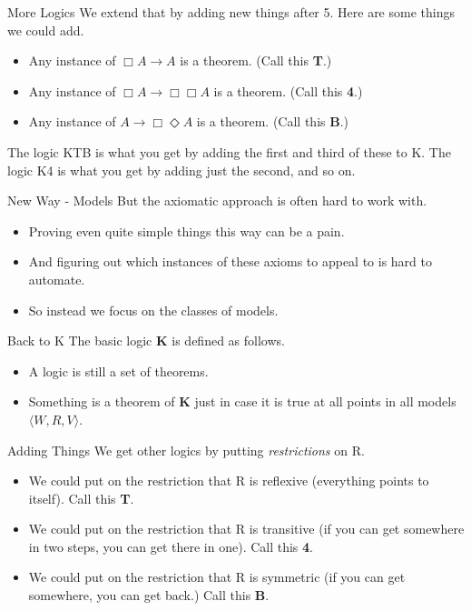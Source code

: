 \documentclass[
  ignorenonframetext,
]{beamer}
\providecommand{\tightlist}{%
  \setlength{\itemsep}{0pt}\setlength{\parskip}{0pt}}
\renewcommand{\,}{\text{, }}
\begin{document}
\begin{frame}{More Logics}
\protect\hypertarget{more-logics}{}
We extend that by adding new things after 5. Here are some things we
could add.

\begin{itemize}
\tightlist
\item
  Any instance of \(\Box A \rightarrow A\) is a theorem. (Call this
  \textbf{T}.)
\item
  Any instance of \(\Box A \rightarrow \Box \Box A\) is a theorem. (Call
  this \textbf{4}.)
\item
  Any instance of \(A \rightarrow \Box \Diamond A\) is a theorem. (Call
  this \textbf{B}.)
\end{itemize}

The logic KTB is what you get by adding the first and third of these to
K. The logic K4 is what you get by adding just the second, and so on.
\end{frame}

\begin{frame}{New Way - Models}
\protect\hypertarget{new-way---models}{}
But the axiomatic approach is often hard to work with.

\begin{itemize}
\tightlist
\item
  Proving even quite simple things this way can be a pain.
\item
  And figuring out which instances of these axioms to appeal to is hard
  to automate.
\item
  So instead we focus on the classes of models.
\end{itemize}
\end{frame}

\begin{frame}{Back to K}
\protect\hypertarget{back-to-k}{}
The basic logic \textbf{K} is defined as follows.

\begin{itemize}
\tightlist
\item
  A logic is still a set of theorems.
\item
  Something is a theorem of \textbf{K} just in case it is true at all
  points in all models \(\langle W, R, V \rangle\).
\end{itemize}
\end{frame}

\begin{frame}{Adding Things}
\protect\hypertarget{adding-things}{}
We get other logics by putting \emph{restrictions} on R.

\begin{itemize}
\tightlist
\item
  We could put on the restriction that R is reflexive (everything points
  to itself). Call this \textbf{T}.
\item
  We could put on the restriction that R is transitive (if you can get
  somewhere in two steps, you can get there in one). Call this
  \textbf{4}.
\item
  We could put on the restriction that R is symmetric (if you can get
  somewhere, you can get back.) Call this \textbf{B}.
\end{itemize}
\end{frame}
\end{document}
